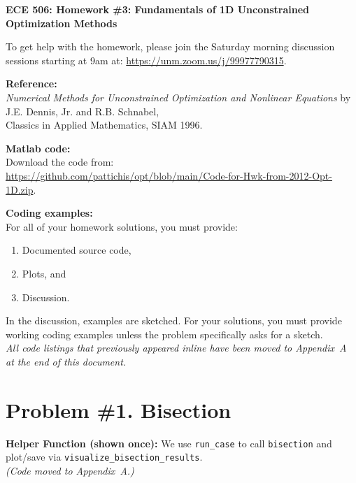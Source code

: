 \documentclass[11pt]{article}
\begin{document}
	
	\textbf{ECE 506: Homework \#3: Fundamentals of 1D Unconstrained Optimization Methods}
	
	\vspace{1em}
	To get help with the homework, please join the Saturday morning discussion sessions starting at 9am at:
	\url{https://unm.zoom.us/j/99977790315}.
	
	\noindent\textbf{Reference:} \\
	\emph{Numerical Methods for Unconstrained Optimization and Nonlinear Equations} by J.E. Dennis, Jr. and R.B. Schnabel, \\
	Classics in Applied Mathematics, SIAM 1996.
	
	\noindent\textbf{Matlab code:} \\
	Download the code from:\\ \url{https://github.com/pattichis/opt/blob/main/Code-for-Hwk-from-2012-Opt-1D.zip}.
	
	\noindent\textbf{Coding examples:} \\
	For all of your homework solutions, you must provide:
	\begin{enumerate}
		\item Documented source code,
		\item Plots, and
		\item Discussion.
	\end{enumerate}
	In the discussion, examples are sketched. For your solutions, you must provide working coding examples unless the problem specifically asks for a sketch.\\
	\textit{All code listings that previously appeared inline have been moved to Appendix~A at the end of this document.}
	
	\newpage
	\section*{Problem \#1. Bisection}
	
	\noindent\textbf{Helper Function (shown once):} We use \texttt{run\_case} to call \texttt{bisection} and plot/save via \texttt{visualize\_bisection\_results}.\\
	\emph{(Code moved to Appendix~A.)}
	
\end{document}
